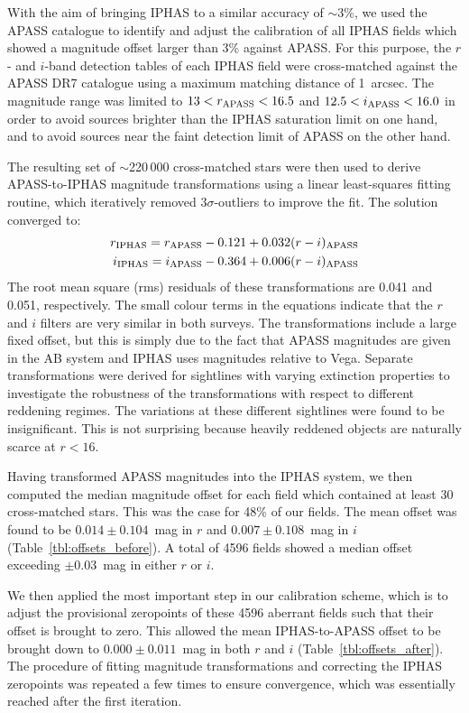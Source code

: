 \documentclass[useAMS,usenatbib]{mn2e}
\begin{document}
With the aim of bringing IPHAS to a similar accuracy of $\sim$3\%,
we used the APASS catalogue to identify and adjust the calibration of all IPHAS fields 
which showed a magnitude offset larger than 3\% against APASS.
For this purpose,
the $r$- and $i$-band detection tables of each IPHAS field
were cross-matched against the APASS DR7 catalogue 
using a maximum matching distance of 1~arcsec.
The magnitude range was limited to
$13<r_{\rm APASS}<16.5$ and $12.5<i_{\rm APASS}<16.0$
in order to avoid sources 
brighter than the IPHAS saturation limit on one hand, 
and to avoid sources near the faint detection limit of APASS 
on the other hand.

The resulting set of $\sim$220\,000 cross-matched stars were then used 
to derive APASS-to-IPHAS magnitude transformations
using a linear least-squares fitting routine, 
which iteratively removed $3\sigma$-outliers to improve the fit.
The solution converged to:
\begin{align} 
r_{\rm IPHAS} = r_{\rm APASS} - 0.121 + 0.032(r-i)_{\rm APASS} \label{eqn:apass_r} \\
i_{\rm IPHAS} = i_{\rm APASS} - 0.364 + 0.006(r-i)_{\rm APASS} \label{eqn:apass_i}
\end{align}
The root mean square (rms) residuals of these transformations 
are 0.041 and 0.051, respectively.
The small colour terms in the equations
indicate that the $r$ and $i$ filters 
are very similar in both surveys.
The transformations include a large fixed offset,
but this is simply due to the fact that 
APASS magnitudes are given in the AB system
and IPHAS uses magnitudes relative to Vega.
Separate transformations were derived for sightlines 
with varying extinction properties to investigate the robustness
of the transformations with respect to different reddening regimes.
The variations at these different
sightlines were found to be insignificant.
This is not surprising because heavily reddened objects 
are naturally scarce at $r<16$.

Having transformed APASS magnitudes into the IPHAS system,
we then computed the median magnitude offset 
for each field which contained at least 30 cross-matched stars.
This was the case for 48\% of our fields.
The mean offset was found to be
$0.014\pm0.104$~mag in $r$ and $0.007\pm0.108$~mag in $i$
(Table~\ref{tbl:offsets_before}).
A total of 4596 fields showed a median offset
exceeding $\pm$0.03~mag in either $r$ or $i$.

We then applied the most important step in our calibration scheme,
which is to adjust the provisional zeropoints of these 4596 aberrant fields
such that their offset is brought to zero.
This allowed the mean IPHAS-to-APASS offset 
to be brought down to $0.000\pm0.011$~mag in both $r$ and $i$
(Table~\ref{tbl:offsets_after}).
The procedure of fitting magnitude transformations and
correcting the IPHAS zeropoints was repeated a few times to ensure 
convergence, which was essentially reached after the first iteration.
\end{document}
